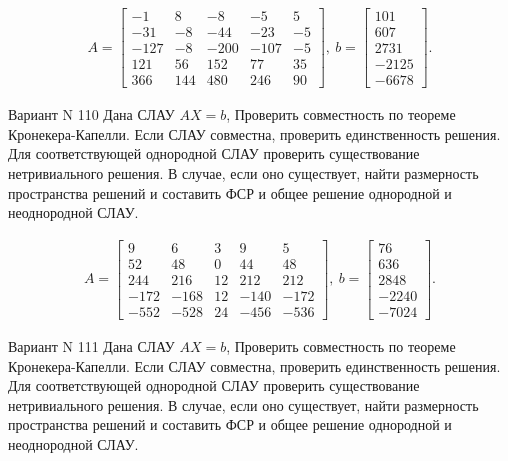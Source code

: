 \documentclass[11pt]{report}
\begin{document}
\begin{align*}
 A = \left[\begin{matrix}-1 & 8 & -8 & -5 & 5\\-31 & -8 & -44 & -23 & -5\\-127 & -8 & -200 & -107 & -5\\121 & 56 & 152 & 77 & 35\\366 & 144 & 480 & 246 & 90\end{matrix}\right],
\ b = \left[\begin{matrix}101\\607\\2731\\-2125\\-6678\end{matrix}\right]. 
 \end{align*}

Вариант N 110
Дана СЛАУ $AX = b$,
Проверить совместность по теореме Кронекера-Капелли. Если СЛАУ совместна, проверить единственность решения.
Для соответствующей однородной СЛАУ проверить существование нетривиального решения. В случае, если оно существует,
найти размерность пространства решений и составить ФСР и общее решение однородной  и неоднородной СЛАУ.


\begin{align*}
 A = \left[\begin{matrix}9 & 6 & 3 & 9 & 5\\52 & 48 & 0 & 44 & 48\\244 & 216 & 12 & 212 & 212\\-172 & -168 & 12 & -140 & -172\\-552 & -528 & 24 & -456 & -536\end{matrix}\right],
\ b = \left[\begin{matrix}76\\636\\2848\\-2240\\-7024\end{matrix}\right]. 
 \end{align*}

Вариант N 111
Дана СЛАУ $AX = b$,
Проверить совместность по теореме Кронекера-Капелли. Если СЛАУ совместна, проверить единственность решения.
Для соответствующей однородной СЛАУ проверить существование нетривиального решения. В случае, если оно существует,
найти размерность пространства решений и составить ФСР и общее решение однородной  и неоднородной СЛАУ.
\end{document}
